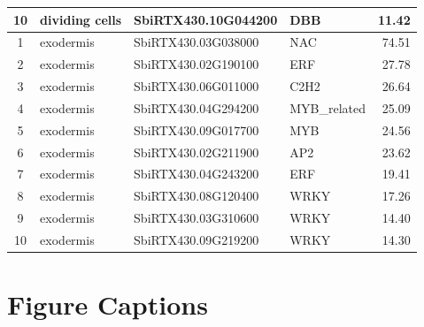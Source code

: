 \begin{table}[htbp]
\begin{singlespace}
\begin{tabular}{clll r}
10 & dividing cells & SbiRTX430.10G044200 & DBB         & 11.42 \\
\midrule
1  & exodermis & SbiRTX430.03G038000 & NAC         & 74.51 \\
2  & exodermis & SbiRTX430.02G190100 & ERF         & 27.78 \\
3  & exodermis & SbiRTX430.06G011000 & C2H2        & 26.64 \\
4  & exodermis & SbiRTX430.04G294200 & MYB\_related & 25.09 \\
5  & exodermis & SbiRTX430.09G017700 & MYB         & 24.56 \\
6  & exodermis & SbiRTX430.02G211900 & AP2         & 23.62 \\
7  & exodermis & SbiRTX430.04G243200 & ERF         & 19.41 \\
8  & exodermis & SbiRTX430.08G120400 & WRKY        & 17.26 \\
9  & exodermis & SbiRTX430.03G310600 & WRKY        & 14.40 \\
10 & exodermis & SbiRTX430.09G219200 & WRKY        & 14.30 \\
\bottomrule
\end{tabular}
\end{singlespace}
\end{table}

\clearpage

\section*{Figure Captions}


\ifshowfigures
\begin{center}
\end{center}
\vspace{4pt}
\fi
{}

